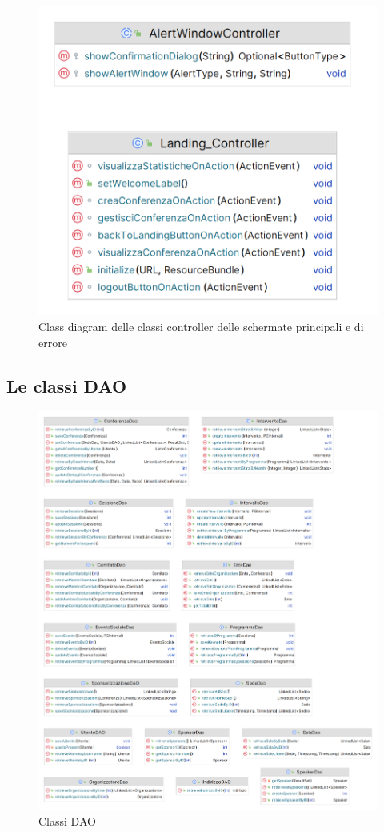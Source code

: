 \begin{figure}[h!]
	\centering
	\includegraphics[scale=0.3]{Immagini/Landing_Controller.png}
	\caption{Class diagram delle classi controller delle schermate principali e di errore}
\end{figure}
\newpage
\subsection{Le classi DAO}
\begin{figure}[h!]
	\includegraphics[scale=0.2]{Immagini/ClassiDAO.png}
	\caption{Classi DAO}
\end{figure}